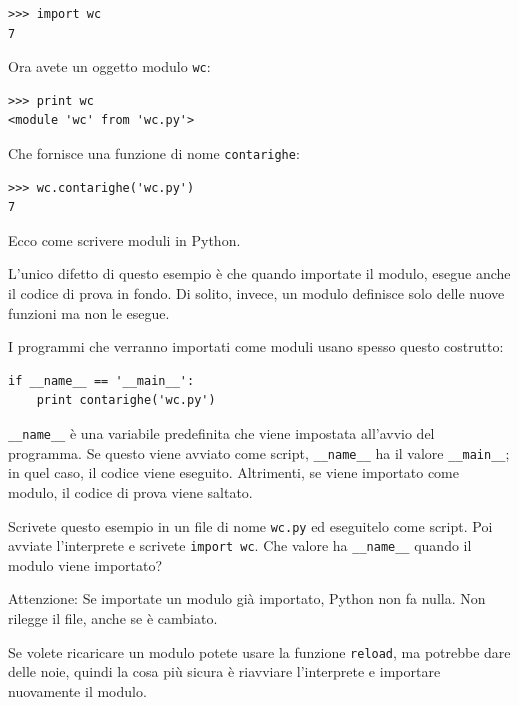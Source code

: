 \documentclass[10pt]{book}
\begin{document}
\begin{verbatim}
>>> import wc
7
\end{verbatim}
%
Ora avete un oggetto modulo {\tt wc}:

\begin{verbatim}
>>> print wc
<module 'wc' from 'wc.py'>
\end{verbatim}
%
Che fornisce una funzione di nome \verb"contarighe":

\begin{verbatim}
>>> wc.contarighe('wc.py')
7
\end{verbatim}
%
Ecco come scrivere moduli in Python.

L'unico difetto di questo esempio è che quando importate il modulo, esegue anche il codice di prova in fondo. Di solito, invece, un modulo definisce solo delle nuove funzioni ma non le esegue.

I programmi che verranno importati come moduli usano spesso questo costrutto:

\begin{verbatim}
if __name__ == '__main__':
    print contarighe('wc.py')
\end{verbatim}
%
\verb"__name__" è una variabile predefinita che viene impostata all'avvio del programma. Se questo viene avviato come script,
\verb"__name__" ha il valore \verb"__main__"; in quel caso, il codice viene eseguito. Altrimenti, se viene importato come modulo, il codice di prova viene saltato.

\vspace{0.2in}
\begin{exercise}

Scrivete questo esempio in un file di nome {\tt wc.py} ed eseguitelo come script. Poi avviate l'interprete e scrivete
{\tt import wc}.  Che valore ha \verb"__name__"
quando il modulo viene importato?

Attenzione: Se importate un modulo già importato, Python non fa nulla. Non rilegge il file, anche se è cambiato.

Se volete ricaricare un modulo potete usare la funzione {\tt reload}, ma potrebbe dare delle noie, quindi la cosa più sicura è riavviare l'interprete e importare nuovamente il modulo.

\end{exercise}
\end{document}
